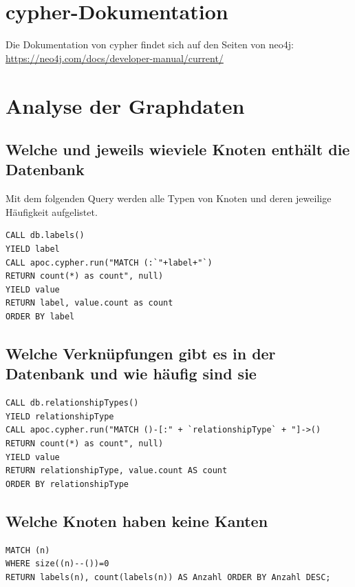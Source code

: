 \documentclass[ngerman,]{scrreprt}
\begin{document}
\section{cypher-Dokumentation}\label{cypher-dokumentation}

Die Dokumentation von cypher findet sich auf den Seiten von neo4j: \url{https://neo4j.com/docs/developer-manual/current/}

\section{Analyse der Graphdaten}\label{analyse-der-graphdaten}

\subsection{Welche und jeweils wieviele Knoten enthält die Datenbank}\label{welche-und-jeweils-wieviele-knoten-enthuxe4lt-die-datenbank}

Mit dem folgenden Query werden alle Typen von Knoten und deren jeweilige Häufigkeit aufgelistet.

\begin{verbatim}
CALL db.labels()
YIELD label
CALL apoc.cypher.run("MATCH (:`"+label+"`)
RETURN count(*) as count", null)
YIELD value
RETURN label, value.count as count
ORDER BY label
\end{verbatim}

\subsection{Welche Verknüpfungen gibt es in der Datenbank und wie häufig sind sie}\label{welche-verknuxfcpfungen-gibt-es-in-der-datenbank-und-wie-huxe4ufig-sind-sie}

\begin{verbatim}
CALL db.relationshipTypes()
YIELD relationshipType
CALL apoc.cypher.run("MATCH ()-[:" + `relationshipType` + "]->()
RETURN count(*) as count", null)
YIELD value
RETURN relationshipType, value.count AS count
ORDER BY relationshipType
\end{verbatim}

\subsection{Welche Knoten haben keine Kanten}\label{welche-knoten-haben-keine-kanten}

\begin{verbatim}
MATCH (n)
WHERE size((n)--())=0
RETURN labels(n), count(labels(n)) AS Anzahl ORDER BY Anzahl DESC;
\end{verbatim}
\end{document}
